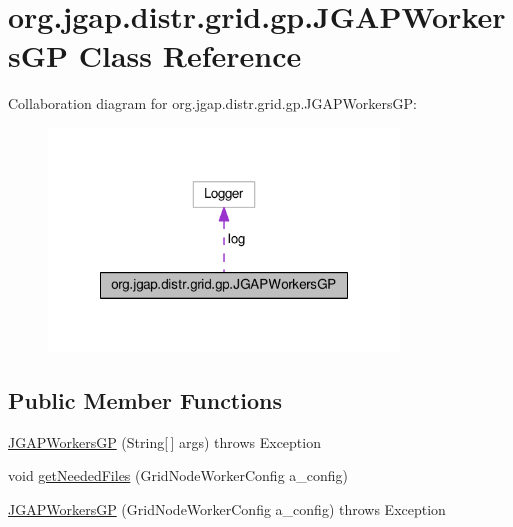 \hypertarget{classorg_1_1jgap_1_1distr_1_1grid_1_1gp_1_1_j_g_a_p_workers_g_p}{\section{org.\-jgap.\-distr.\-grid.\-gp.\-J\-G\-A\-P\-Workers\-G\-P Class Reference}
\label{classorg_1_1jgap_1_1distr_1_1grid_1_1gp_1_1_j_g_a_p_workers_g_p}
}


Collaboration diagram for org.\-jgap.\-distr.\-grid.\-gp.\-J\-G\-A\-P\-Workers\-G\-P\-:
\nopagebreak
\begin{figure}[H]
\begin{center}
\leavevmode
\includegraphics[width=264pt]{classorg_1_1jgap_1_1distr_1_1grid_1_1gp_1_1_j_g_a_p_workers_g_p__coll__graph}
\end{center}
\end{figure}
\subsection*{Public Member Functions}
\begin{DoxyCompactItemize}
\item 
\hyperlink{classorg_1_1jgap_1_1distr_1_1grid_1_1gp_1_1_j_g_a_p_workers_g_p_a8ab7615ddb73b83645b57c6003118b75}{J\-G\-A\-P\-Workers\-G\-P} (String\mbox{[}$\,$\mbox{]} args)  throws Exception 
\item 
void \hyperlink{classorg_1_1jgap_1_1distr_1_1grid_1_1gp_1_1_j_g_a_p_workers_g_p_a45d28e995ace9be9709cf592c69d5b39}{get\-Needed\-Files} (Grid\-Node\-Worker\-Config a\-\_\-config)
\item 
\hyperlink{classorg_1_1jgap_1_1distr_1_1grid_1_1gp_1_1_j_g_a_p_workers_g_p_a7dcb9f74634dea24a40e6bf2d31d3351}{J\-G\-A\-P\-Workers\-G\-P} (Grid\-Node\-Worker\-Config a\-\_\-config)  throws Exception 
\end{DoxyCompactItemize}
